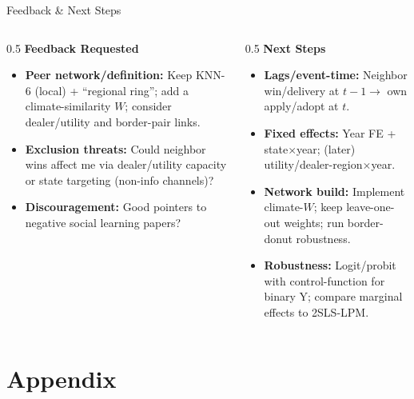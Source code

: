 \documentclass[10pt]{beamer}
\begin{document}
\begin{frame}{Feedback \& Next Steps}
\begin{columns}[T]
\begin{column}{0.5\textwidth}
\textbf{Feedback Requested}
\begin{itemize}
  \item \textbf{Peer network/definition:} Keep KNN-6 (local) + “regional ring”; add a climate-similarity $W$; consider dealer/utility and border-pair links.
  \item \textbf{Exclusion threats:} Could neighbor wins affect me via dealer/utility capacity or state targeting (non-info channels)?
  \item \textbf{Discouragement:} Good pointers to negative social learning papers?
\end{itemize}
\end{column}
\begin{column}{0.5\textwidth}
\textbf{Next Steps}
\begin{itemize}
  \item \textbf{Lags/event-time:} Neighbor win/delivery at $t\!-\!1 \rightarrow$ own apply/adopt at $t$.
  \item \textbf{Fixed effects:} Year FE + state$\times$year; (later) utility/dealer-region$\times$year.
  \item \textbf{Network build:} Implement climate-$W$; keep leave-one-out weights; run border-donut robustness.
  \item \textbf{Robustness:} Logit/probit with control-function for binary Y; compare marginal effects to 2SLS-LPM.
\end{itemize}
\end{column}
\end{columns}
\end{frame}


\appendix
\setcounter{framenumber}{0}
\section{Appendix}
\end{document}
